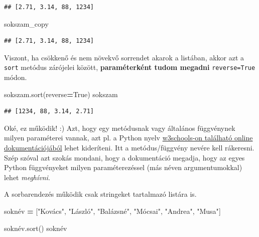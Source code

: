 \documentclass[
]{book}
\newenvironment{Shaded}{\begin{snugshade}}{\end{snugshade}}
\newcommand{\NormalTok}[1]{#1}
\newcommand{\OperatorTok}[1]{\textcolor[rgb]{0.81,0.36,0.00}{\textbf{#1}}}
\newcommand{\StringTok}[1]{\textcolor[rgb]{0.31,0.60,0.02}{#1}}
\newcommand{\VariableTok}[1]{\textcolor[rgb]{0.00,0.00,0.00}{#1}}
\begin{document}
\begin{verbatim}
## [2.71, 3.14, 88, 1234]
\end{verbatim}

\begin{Shaded}
\begin{Highlighting}[]
\NormalTok{sokszam\_copy}
\end{Highlighting}
\end{Shaded}

\begin{verbatim}
## [2.71, 3.14, 88, 1234]
\end{verbatim}

Viszont, ha csökkenő és nem növekvő sorrendet akarok a listában, akkor azt a \texttt{sort} metódus zárójelei között, \textbf{paraméterként tudom megadni} \texttt{reverse=True} módon.

\begin{Shaded}
\begin{Highlighting}[]
\NormalTok{sokszam.sort(reverse}\OperatorTok{=}\VariableTok{True}\NormalTok{)}
\NormalTok{sokszam}
\end{Highlighting}
\end{Shaded}

\begin{verbatim}
## [1234, 88, 3.14, 2.71]
\end{verbatim}

Oké, ez működik! :) Azt, hogy egy metódusnak vagy általános függvénynek milyen paraméterei vannak, azt pl. a Python nyelv \href{https://www.w3schools.com/python/ref_list_sort.asp}{w3schools-on található online dokumentációjából} lehet kideríteni. Itt a metódus/függvény nevére kell rákeresni.
Szép szóval azt szokás mondani, hogy a dokumentáció megadja, hogy az egyes Python függvényeket milyen paraméterezéssel (más néven argumentumokkal) lehet \emph{meghívni}.

A sorbarendezés működik csak stringeket tartalmazó listára is.

\begin{Shaded}
\begin{Highlighting}[]
\NormalTok{soknév }\OperatorTok{=}\NormalTok{ [}\StringTok{"Kovács"}\NormalTok{, }\StringTok{"László"}\NormalTok{, }\StringTok{"Balázsné"}\NormalTok{, }\StringTok{"Mócsai"}\NormalTok{, }\StringTok{"Andrea"}\NormalTok{, }\StringTok{"Musa"}\NormalTok{]}

\NormalTok{soknév.sort()}
\NormalTok{soknév}
\end{Highlighting}
\end{Shaded}
\end{document}
